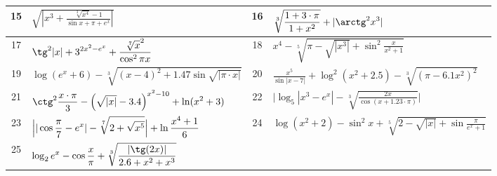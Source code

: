 {\begin{longtable}{|c|l||c|l|}
15 &
$\displaystyle
\sqrt{\left|x^{3}+\frac{\sqrt[{3}]{x^{4}}-1}{\sin x+\pi +e^{x}}\right|}
$
&%
16 &
$\displaystyle
\sqrt[{{3}}]{\frac{1+3\cdot \pi }{1+x^{2}}}+|\arctg^2x^3|
$
\\\hline
17 &
$\displaystyle
\tg^2|x|+3^{2x^2-e^x}+\frac{\sqrt[{7}]x^2}{\cos^2{\pi x}}
$
&%
18 &
$\displaystyle
x^4-\sqrt[{5}]{\pi -\sqrt{|x^{3}|}+\sin^2\frac{x}{x^{2}+1}}
$
\\\hline
19 &
$\displaystyle
\log (e^{x}+6)-\sqrt[{3}]{(x-4)^{2}+1.47\sin\sqrt{|\pi \cdot x|}}
$
&%
20 &
$\displaystyle
\frac{x^5}{\sin |x-7|}+\log^2(x^2+2.5)-\sqrt[{3}]{(\pi -6.1x^2)^2}
$
\\\hline
21 &
$\displaystyle
\ctg^2\frac{x\cdot \pi }{3}-\Bigl(\sqrt{|x|}-3.4\Bigr)^{x^{2}-10}+\ln (x^{2}+3)
$
&%
22 &
$\displaystyle
\Biggl|\log_5|x^3-e^x|-\sqrt[3]{\frac{2x}{\cos (x+1.23\cdot \pi )}}\Biggr|
$
\\\hline
23 &
$\displaystyle
\Bigl||\cos \frac{\pi }{7}-e^x|-\sqrt[{7}]{2+\sqrt{x^{5}}}\Bigr|+\ln \frac{x^4+1}{6}
$
&%
24 &
$\displaystyle
\log (x^2+2)-\sin ^2x+\sqrt[{5}]{2-\sqrt{|x|}+\sin \frac{\pi }{e^x+1}}
$
\\\hline
25 &
$\displaystyle
\log _2e^x-\cos \frac{x}{\pi }+\sqrt[{3}]{\frac{|\tg (2x)|}{2.6+x^2+x^3}}
$
&&
\\\hline
\end{longtable}
}
